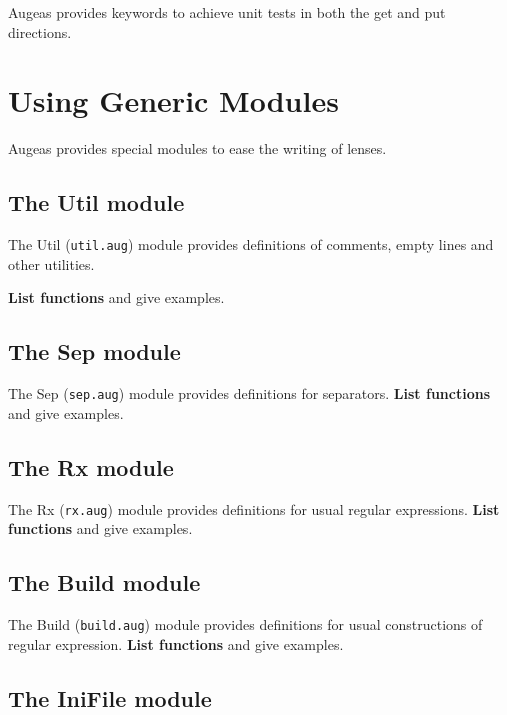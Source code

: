 Augeas provides keywords to achieve unit tests in both the get and put directions.

\section{Using Generic Modules}

Augeas provides special modules to ease the writing of lenses.

\subsection{The Util module}

The Util (\verb!util.aug!) module provides definitions of comments, empty lines and other utilities.

\textbf{List functions} and give examples.

\subsection{The Sep module}

The Sep (\verb!sep.aug!) module provides definitions for separators. \textbf{List functions} and give examples.

\begin{quote}

\end{quote}
\subsection{The Rx module}

The Rx (\verb!rx.aug!) module provides definitions for usual regular expressions. \textbf{List functions} and give examples.

\subsection{The Build module}

The Build (\verb!build.aug!) module provides definitions for usual constructions of regular expression. \textbf{List functions} and give examples.

\subsection{The IniFile module}

